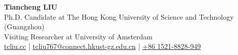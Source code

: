 \documentclass[a4paper,12pt]{extarticle}
\begin{document}
\pagestyle{fancy}
\renewcommand{\headrulewidth}{0pt}
\fancyhead{}
\thispagestyle{empty}

\begin{flushleft}
\textbf{\LARGE Tiancheng LIU}\\[2pt]
Ph.D. Candidate at The Hong Kong University of Science and Technology (Guangzhou)\\
Visiting Researcher at University of Amsterdam\\
\href{https://tcliu.cc}{tcliu.cc} |
\href{mailto:tcliu767@connect.hkust-gz.edu.cn}{tcliu767@connect.hkust-gz.edu.cn} |
\href{tel:15218828949}{+86 1521-8828-949}
\end{flushleft}











\end{document}
